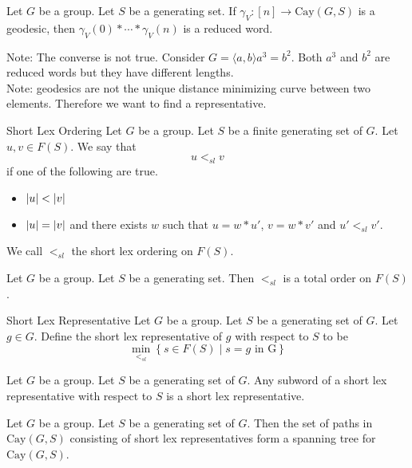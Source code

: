 \documentclass[a4paper]{article}
\begin{document}
\begin{lmm}{}{} Let $G$ be a group. Let $S$ be a generating set. If $\gamma_V:[n]\to\text{Cay}(G,S)$ is a geodesic, then $\gamma_V(0)\ast\cdots\ast\gamma_V(n)$ is a reduced word. 
\end{lmm}

Note: The converse is not true. Consider $G=\langle a,b\rangle a^3=b^2$. Both $a^3$ and $b^2$ are reduced words but they have different lengths. \\

Note: geodesics are not the unique distance minimizing curve between two elements. Therefore we want to find a representative. 

\begin{defn}{Short Lex Ordering}{} Let $G$ be a group. Let $S$ be a finite generating set of $G$. Let $u,v\in F(S)$. We say that $$u<_{sl}v$$ if one of the following are true. 
\begin{itemize}
\item $\abs{u}<\abs{v}$
\item $\abs{u}=\abs{v}$ and there exists $w$ such that $u=w\ast u'$, $v=w\ast v'$ and $u'<_{sl}v'$. 
\end{itemize}
We call $<_{sl}$ the short lex ordering on $F(S)$. 
\end{defn}

\begin{lmm}{}{} Let $G$ be a group. Let $S$ be a generating set. Then $<_{sl}$ is a total order on $F(S)$. 
\end{lmm}

\begin{defn}{Short Lex Representative}{} Let $G$ be a group. Let $S$ be a generating set of $G$. Let $g\in G$. Define the short lex representative of $g$ with respect to $S$ to be $$\min_{<_{sl}}\left\{s\in F(S)\;|\;s=g\text{ in G}\right\}$$
\end{defn}

\begin{lmm}{}{} Let $G$ be a group. Let $S$ be a generating set of $G$. Any subword of a short lex representative with respect to $S$ is a short lex representative. 
\end{lmm}

\begin{crl}{}{} Let $G$ be a group. Let $S$ be a generating set of $G$. Then the set of paths in $\text{Cay}(G,S)$ consisting of short lex representatives form a spanning tree for $\text{Cay}(G,S)$. 
\end{crl}
\end{document}
